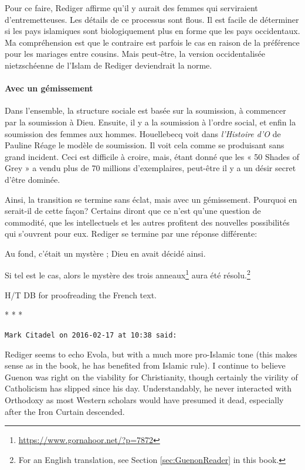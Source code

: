 Pour ce faire, Rediger affirme qu'il y aurait des femmes qui serviraient d'entremetteuses. Les détails de ce processus sont flous. Il est facile de déterminer si les pays islamiques sont biologiquement plus en forme que les pays occidentaux. Ma compréhension est que le contraire est parfois le cas en raison de la préférence pour les mariages entre cousins. Mais peut-être, la version occidentalisée nietzschéenne de l'Islam de Rediger deviendrait la norme.

\paragraph{Avec un gémissement}


Dans l'ensemble, la structure sociale est basée sur la soumission, à commencer par la soumission à Dieu. Ensuite, il y a la soumission à l'ordre social, et enfin la soumission des femmes aux hommes. Houellebecq voit dans \emph{l'Histoire d'O} de Pauline Réage le modèle de soumission. Il voit cela comme se produisant sans grand incident. Ceci est difficile à croire, mais, étant donné que les « 50 Shades of Grey » a vendu plus de 70 millions d'exemplaires, peut-être il y a un désir secret d'être dominée.

Ainsi, la transition se termine sans éclat, mais avec un gémissement. Pourquoi en serait-il de cette façon? Certains diront que ce n'est qu'une question de commodité, que les intellectuels et les autres profitent des nouvelles possibilités qui s'ouvrent pour eux. Rediger se termine par une réponse différente:

\begin{quotex}
Au fond, c'était un mystère ; Dieu en avait décidé ainsi.
\end{quotex}


Si tel est le cas, alors le mystère des trois anneaux\footnote{\url{https://www.gornahoor.net/?p=7872}} aura été résolu.\footnote{For an English translation, see Section \ref{sec:GuenonReader} in this book.}

H/T DB for proofreading the French text.


\begin{center}* * *\end{center}

\begin{footnotesize}
\begin{sffamily}

\texttt{Mark Citadel on 2016-02-17 at 10:38 said:}

Rediger seems to echo Evola, but with a much more pro-Islamic tone (this makes sense as in the book, he has benefited from Islamic rule). I continue to believe Guenon was right on the viability for Christianity, though certainly the virility of Catholicism has slipped since his day. Understandably, he never interacted with Orthodoxy as most Western scholars would have presumed it dead, especially after the Iron Curtain descended.

\end{sffamily}
\end{footnotesize}

